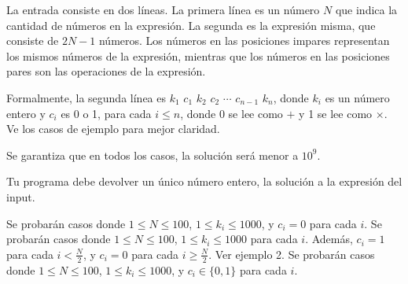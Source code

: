 \documentclass{oci}
\begin{document}
\begin{inputDescription}
La entrada consiste en dos líneas. La primera línea es un número $N$ que indica la cantidad de números en la expresión. La segunda es la expresión misma, que consiste de $2N-1$ números. Los números en las posiciones impares representan los mismos números de la expresión, mientras que los números en las posiciones pares son las operaciones de la expresión. 

Formalmente, la segunda línea es $k_1$ $c_1$ $k_2$ $c_2$ $\cdots$ $c_{n-1}$ $k_n$, donde $k_i$ es un número entero y $c_i$ es 0 o 1, para cada $i \leq n$, donde 0 se lee como $+$ y 1 se lee como $\times$. Ve los casos de ejemplo para mejor claridad.

Se garantiza que en todos los casos, la solución será menor a $10^9$.
\end{inputDescription}

\begin{outputDescription}
Tu programa debe devolver un único número entero, la solución a la expresión del input.
\end{outputDescription}

\begin{scoreDescription}
   Se probarán casos donde $1 \leq N \leq 100$, $1\leq k_i \leq 1000$, y $c_i = 0$ para cada $i$.
   Se probarán casos donde $1 \leq N \leq 100$, $1\leq k_i \leq 1000$ para cada $i$. Además, $c_i = 1$ para cada $i < \frac{N}{2}$, y $c_i = 0$ para cada $i \geq \frac{N}{2}$. Ver ejemplo 2.
   Se probarán casos donde $1 \leq N \leq 100$, $1\leq k_i \leq 1000$, y $c_i \in \{0,1\}$ para cada $i$.
\end{scoreDescription}

\begin{sampleDescription}
\end{sampleDescription}
\end{document}
